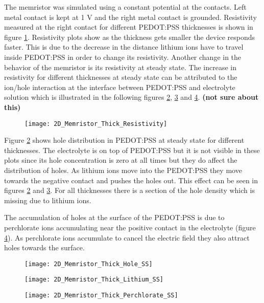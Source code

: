 \begin{doublespace}
The memristor was simulated using a constant potential at the contacts. Left metal contact is kept at 1 V and the right metal contact is grounded. Resistivity measured at the right contact for different PEDOT:PSS thicknesses is shown in figure \ref{thick_resistivity}. Resistivity plots show as the thickness gets smaller the device responds faster. This is due to the decrease in the distance lithium ions have to travel inside PEDOT:PSS in order to change its resistivity. Another change in the behavior of the memristor is its resistivity at steady state. The increase in resistivity for different thicknesses at steady state can be attributed to the ion/hole interaction at the interface between PEDOT:PSS and electrolyte solution which is illustrated in the following figures \ref{thick_p_ss}, \ref{thick_li_ss} and \ref{thick_perch_ss}. \textbf{(not sure about this)}

\begin{figure}[!htp]
\centering
\texttt{[image: 2D\_Memristor\_Thick\_Resistivity]}
\caption{} 
\label{thick_resistivity}
\end{figure}

Figure \ref{thick_p_ss} shows hole distribution in PEDOT:PSS at steady state for different thicknesses. The electrolyte is on top of PEDOT:PSS but it is not visible in these plots since its hole concentration is zero at all times but they do affect the distribution of holes. As lithium ions move into the PEDOT:PSS they move towards the negative contact and pushes the holes out. This effect can be seen in figures \ref{thick_p_ss} and  \ref{thick_li_ss}. For all thicknesses there is a section of the hole density which is missing due to lithium ions.

The accumulation of holes at the surface of the PEDOT:PSS is due to perchlorate ions accumulating near the positive contact in the electrolyte (figure \ref{thick_perch_ss}). As perchlorate ions accumulate to cancel the electric field they also attract holes towards the surface.
\begin{figure}[!htp]
\centering
\texttt{[image: 2D\_Memristor\_Thick\_Hole\_SS]}
\caption{} 
\label{thick_p_ss}
\end{figure}

\begin{figure}[!htp]
\centering
\texttt{[image: 2D\_Memristor\_Thick\_Lithium\_SS]}
\caption{} 
\label{thick_li_ss}
\end{figure}

\begin{figure}[!htp]
\centering
\texttt{[image: 2D\_Memristor\_Thick\_Perchlorate\_SS]}
\caption{} 
\label{thick_perch_ss}
\end{figure}


\end{doublespace}
